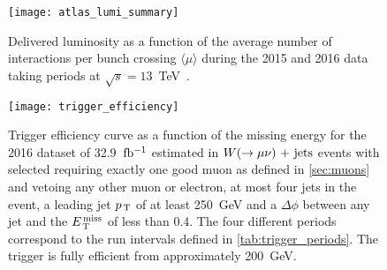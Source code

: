 \begin{figure}[!htb]
  \centering
    \texttt{[image: atlas\_lumi\_summary]}
    \caption{Delivered luminosity as a function of the average number of
      interactions per bunch crossing $\langle \mu \rangle$ during the 2015 and
      2016 data taking periods at $\sqrt{s} = 13$~TeV~\cite{LumiSummaryPlots}.}
    \label{fig:lumi_summary}
\end{figure}
\begin{figure}[!htb]
  \centering
    \texttt{[image: trigger\_efficiency]}
    \caption{Trigger efficiency curve as a function of the missing energy for
      the 2016 dataset of 32.9~$\mbox{fb$^{-1}$}$ estimated in $W (\rightarrow \mu \nu)\mathrm{~+~jets}$ events with
      selected requiring exactly one good muon as defined in \cref{sec:muons}
      and vetoing any other muon or electron, at most four jets in the event, a
      leading jet $p_\mathrm{\, T}$ of at least 250~GeV and a $\Delta \phi$ between any jet
      and the $E_\mathrm{\, T}^\mathrm{\, miss}$ of less than 0.4. The four different periods correspond to
      the run intervals defined in \cref{tab:trigger_periods}. The trigger is
      fully efficient from approximately 200~GeV.}
    \label{fig:trigger_efficiency}
\end{figure}
